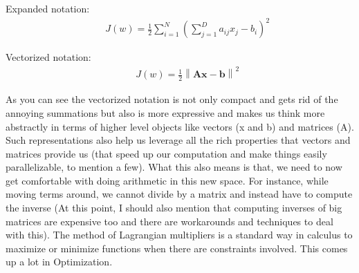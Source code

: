 \documentclass[a4paper]{article}
\begin{document}
Expanded notation:
\begin{equation} \label{eq:4}
\begin{aligned}
& & J(w) = \frac{1}{2} \sum_{i=1}^{N} (\sum_{j=1}^{D} a_{ij} x_j - b_i)^2
\end{aligned}
\end{equation}

Vectorized notation:
\begin{equation} \label{eq:5}
\begin{aligned}
& & J(w) = \frac{1}{2} \left\lVert \mathbf{A} \boldsymbol{x} - \boldsymbol{b} \right\rVert ^2
\end{aligned}
\end{equation}

\noindent As you can see the vectorized notation is not only compact and gets rid of the annoying summations but also is more expressive and makes us think more abstractly in terms of higher level objects like vectors (x and b) and matrices (A). Such representations also help us leverage all the rich properties that vectors and matrices provide us (that speed up our computation and make things easily parallelizable, to mention a few). What this also means is that, we need to now get comfortable with doing arithmetic in this new space. For instance, while moving terms around, we cannot divide by a matrix and instead have to compute the inverse (At this point, I should also mention that computing inverses of big matrices are expensive too and there are workarounds and techniques to deal with this). The method of Lagrangian multipliers is a standard way in calculus to maximize or minimize functions when there are constraints involved. This comes up a lot in Optimization. \\
\end{document}
